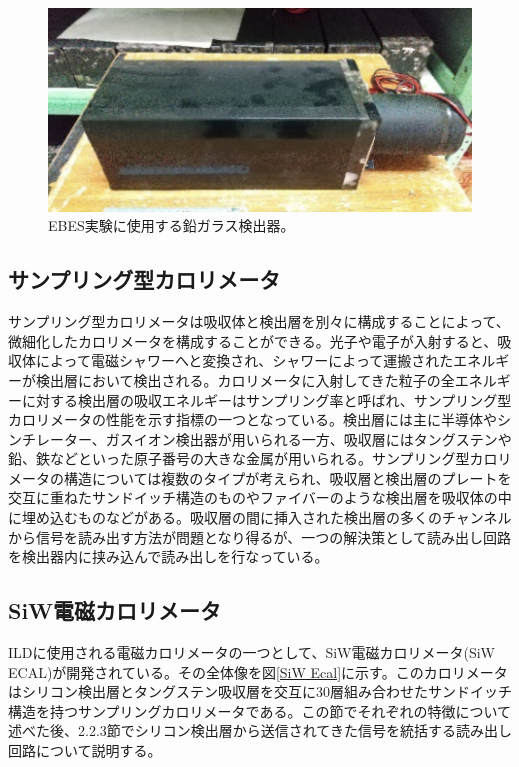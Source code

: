 \begin{figure}[H]
	\begin{center}
		\includegraphics[width=370pt]{./Figure/EcalDetector/PbO.png}
		\caption[EBES実験に使用する鉛ガラス検出器]{EBES実験に使用する鉛ガラス検出器。}
		\label{PbO}
	\end{center}
\end{figure}


\subsection{サンプリング型カロリメータ}
サンプリング型カロリメータは吸収体と検出層を別々に構成することによって、微細化したカロリメータを構成することができる。光子や電子が入射すると、吸収体によって電磁シャワーへと変換され、シャワーによって運搬されたエネルギーが検出層において検出される。カロリメータに入射してきた粒子の全エネルギーに対する検出層の吸収エネルギーはサンプリング率と呼ばれ、サンプリング型カロリメータの性能を示す指標の一つとなっている。検出層には主に半導体やシンチレーター、ガスイオン検出器が用いられる一方、吸収層にはタングステンや鉛、鉄などといった原子番号の大きな金属が用いられる。サンプリング型カロリメータの構造については複数のタイプが考えられ、吸収層と検出層のプレートを交互に重ねたサンドイッチ構造のものやファイバーのような検出層を吸収体の中に埋め込むものなどがある。吸収層の間に挿入された検出層の多くのチャンネルから信号を読み出す方法が問題となり得るが、一つの解決策として読み出し回路を検出器内に挟み込んで読み出しを行なっている。

\subsection{SiW電磁カロリメータ}
ILDに使用される電磁カロリメータの一つとして、SiW電磁カロリメータ(SiW ECAL)が開発されている。その全体像を図\ref{SiW Ecal}に示す。このカロリメータはシリコン検出層とタングステン吸収層を交互に30層組み合わせたサンドイッチ構造を持つサンプリングカロリメータである。この節でそれぞれの特徴について述べた後、2.2.3節でシリコン検出層から送信されてきた信号を統括する読み出し回路について説明する。

